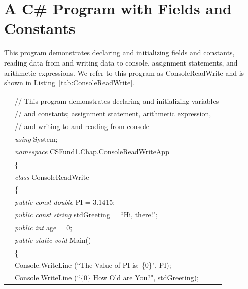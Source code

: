 \section{A C\# Program with Fields and Constants} \label{sec:SecProg}


This program demonstrates declaring and initializing fields and
constants, reading data from and writing data to console,
assignment statements, and arithmetic expressions. We refer to
this program as ConsoleReadWrite and is shown in
Listing~\ref{tab:ConsoleReadWrite}.



\renewcommand{\baselinestretch}{0.8}
\begin{program}
\begin{tabular}{ >{\codelinenumfont}c >{\codelistingfont}l}

1 & // This program demonstrates declaring and initializing variables \\
2 & // and constants; assignment statement, arithmetic expression, \\
3 & // and writing to and reading from console \\
4 & \emph{using} System; \\
5 & \emph{namespace} CSFund1.Chap\thechapter.ConsoleReadWriteApp \\
6 & \{ \\
7 & \hspace{0.2in} \emph{class} ConsoleReadWrite \\
8 & \hspace{0.2in} \{ \\
9 &  \hspace{0.4in} \emph{public const double} PI = 3.1415; \\
10 & \hspace{0.4in} \emph{public const string} stdGreeting = ``Hi, there!"; \\
11 &  \hspace{0.4in} \emph{public int} age = 0; \\
12 & \hspace{0.4in} \emph{public static void} Main() \\
13& \hspace{0.4in} \{ \\
14 & \hspace{0.6in} Console.WriteLine (``The Value of PI is: \{0\}", PI); \\
15 & \hspace{0.6in} Console.WriteLine (``\{0\} How Old are You?", stdGreeting); \\

\end{tabular}
\end{program}
